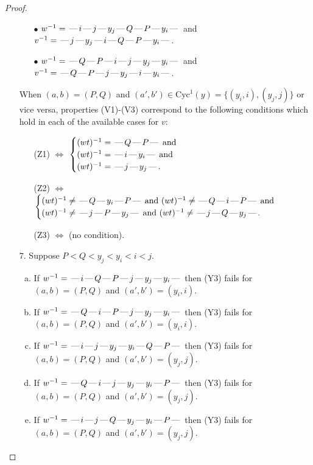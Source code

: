 \documentclass[10pt]{article}
\theoremstyle{definition}
\theoremstyle{definition}
\def\dash{\text{\hspace{0.5mm}---\hspace{0.5mm}}}
\def\Cyc{\mathrm{Cyc}}
\begin{document}
\begin{proof}
\begin{enumerate}
\begin{enumerate}
\item[$\bullet$] $w^{-1} = \dash i\dash j\dash y_j\dash Q\dash P\dash y_i\dash $ and $v^{-1} = \dash j\dash y_j\dash i\dash Q\dash P\dash y_i\dash $.
\item[$\bullet$] $w^{-1} = \dash Q\dash P\dash i\dash j\dash y_j\dash y_i\dash $ and $v^{-1} = \dash Q\dash P\dash j\dash y_j\dash i\dash y_i\dash $.
\end{enumerate}
When $(a,b)= (P,Q)$ and $(a',b')\in \Cyc^1(y)=\{(y_i,i),(y_j,j)\}$ or vice versa,
properties (V1)-(V3) correspond to the following conditions which hold in
each of the available cases for $v$:
\begin{enumerate}
\item[](Z1) $\Leftrightarrow$ $\begin{cases}\text{$(wt)^{-1} = \dash Q \dash P \dash$}\text{ and }\\
\text{$(wt)^{-1} = \dash i \dash y_i \dash$}\text{ and }\\
\text{$(wt)^{-1} = \dash j \dash y_j \dash$}.\end{cases}$
\item[](Z2) $\Leftrightarrow$ $\begin{cases}\text{$(wt)^{-1} \neq \dash Q \dash y_i \dash P \dash$ and $(wt)^{-1}\neq \dash Q \dash i \dash P \dash$}\text{ and }\\
\text{$(wt)^{-1} \neq \dash j \dash P \dash y_j \dash$ and $(wt)^{-1}\neq \dash j \dash Q \dash y_j \dash$}.\end{cases}$
\item[](Z3) $\Leftrightarrow$ (no condition).
\end{enumerate}
\item[$7$.] Suppose $P < Q < y_j < y_i < i < j$.
\begin{enumerate}[(a)]
\item If $w^{-1} = \dash i\dash Q\dash P\dash j\dash y_j\dash y_i\dash $ then (Y3) fails for $(a,b)=(P,Q)$ and $(a',b')=(y_i,i)$.
\item If $w^{-1} = \dash Q\dash i\dash P\dash j\dash y_j\dash y_i\dash $ then (Y3) fails for $(a,b)=(P,Q)$ and $(a',b')=(y_i,i)$.
\item If $w^{-1} = \dash i\dash j\dash y_j\dash y_i\dash Q\dash P\dash $ then (Y3) fails for $(a,b)=(P,Q)$ and $(a',b')=(y_j,j)$.
\item If $w^{-1} = \dash Q\dash i\dash j\dash y_j\dash y_i\dash P\dash $ then (Y3) fails for $(a,b)=(P,Q)$ and $(a',b')=(y_j,j)$.
\item If $w^{-1} = \dash i\dash j\dash Q\dash y_j\dash y_i\dash P\dash $ then (Y3) fails for $(a,b)=(P,Q)$ and $(a',b')=(y_j,j)$.

\end{enumerate}
\end{enumerate}
\end{proof}
\end{document}
